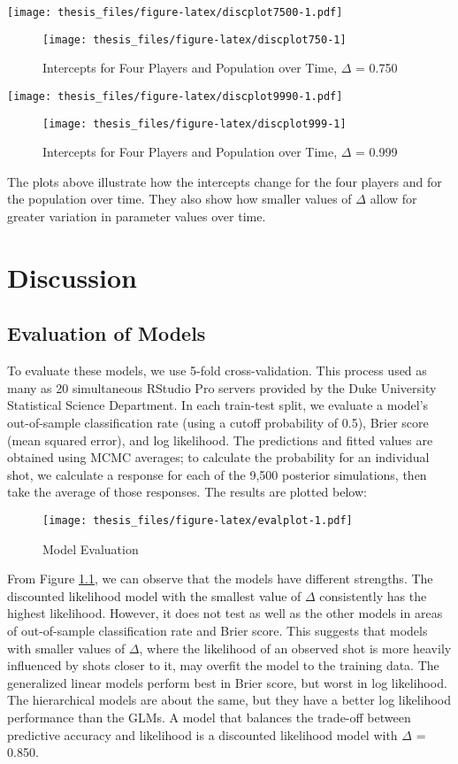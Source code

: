 \documentclass[12pt,twoside]{dukestatscithesis}
\theoremstyle{definition}
\theoremstyle{definition}
\theoremstyle{definition}
\theoremstyle{remark}
\begin{document}
\texttt{[image: thesis\_files/figure-latex/discplot7500-1.pdf]}
\begin{figure}

\hfill{}\texttt{[image: thesis\_files/figure-latex/discplot750-1]} 

\caption{Intercepts for Four Players and Population over Time, $\Delta$ = 0.750}\label{fig:discplot750}
\end{figure}
\texttt{[image: thesis\_files/figure-latex/discplot9990-1.pdf]}
\begin{figure}

\hfill{}\texttt{[image: thesis\_files/figure-latex/discplot999-1]} 

\caption{Intercepts for Four Players and Population over Time, $\Delta$ = 0.999}\label{fig:discplot999}
\end{figure}
The plots above illustrate how the intercepts change for the four
players and for the population over time. They also show how smaller
values of \(\Delta\) allow for greater variation in parameter values
over time.

\chapter{Discussion}\label{disc}

\section{Evaluation of Models}\label{evaluation-of-models}

To evaluate these models, we use 5-fold cross-validation. This process
used as many as 20 simultaneous RStudio Pro servers provided by the Duke
University Statistical Science Department. In each train-test split, we
evaluate a model's out-of-sample classification rate (using a cutoff
probability of 0.5), Brier score (mean squared error), and log
likelihood. The predictions and fitted values are obtained using MCMC
averages; to calculate the probability for an individual shot, we
calculate a response for each of the 9,500 posterior simulations, then
take the average of those responses. The results are plotted below:
\begin{figure}[htbp]
\centering
\texttt{[image: thesis\_files/figure-latex/evalplot-1.pdf]}
\caption{\label{fig:evalplot}Model Evaluation}
\end{figure}
From Figure \ref{fig:evalplot}, we can observe that the models have
different strengths. The discounted likelihood model with the smallest
value of \(\Delta\) consistently has the highest likelihood. However, it
does not test as well as the other models in areas of out-of-sample
classification rate and Brier score. This suggests that models with
smaller values of \(\Delta\), where the likelihood of an observed shot
is more heavily influenced by shots closer to it, may overfit the model
to the training data. The generalized linear models perform best in
Brier score, but worst in log likelihood. The hierarchical models are
about the same, but they have a better log likelihood performance than
the GLMs. A model that balances the trade-off between predictive
accuracy and likelihood is a discounted likelihood model with \(\Delta\)
= 0.850.
\end{document}
